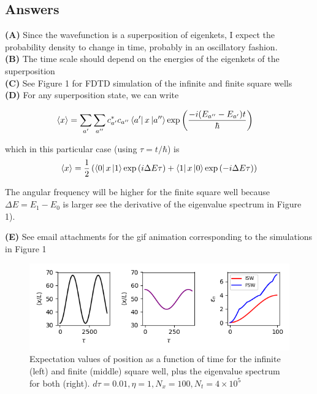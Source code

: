 \documentclass[12pt]{article}
\theoremstyle{definition}
\begin{document}
{\subsection{Answers}

\noindent \textbf{(A)} Since the wavefunction is a superposition of eigenkets, I expect the probability density to change in time, probably in an oscillatory fashion.\\
\noindent \textbf{(B)} The time scale should depend on the energies of the eigenkets of the superposition\\
\noindent \textbf{(C)} See Figure 1 for FDTD simulation of the infinite and finite square wells\\
\noindent \textbf{(D)} For any superposition state, we can write

\begin{align*}
\langle x \rangle &= \sum_{a'}\sum_{a''}c_{a'}^{*}c_{a''}\bra{a'}x\ket{a''}\exp\left(\frac{-i(E_{a''}-E_{a'})t}{\hbar}\right)
\end{align*}

which in this particular case (using $\tau = t/\hbar$) is
\begin{align*}
\langle x \rangle = \frac{1}{2}\left(\bra{0}x\ket{1}\exp\left(i\Delta E\tau\right) + \bra{1}x\ket{0}\exp\left(-i\Delta E\tau\right)\right)\\
\end{align*}


The angular frequency will be higher for the finite square well because $\Delta E = E_{1}-E_{0}$ is larger see the derivative of the eigenvalue spectrum in Figure 1).


\noindent \textbf{(E)} See email attachments for the gif animation corresponding to the simulations in Figure 1


\begin{figure}
\includegraphics[scale=1]{Figure_1.png}
\centering
\caption{Expectation values of position as a function of time for the infinite (left) and finite (middle) square well, plus the eigenvalue spectrum for both (right). $d\tau = 0.01, \eta =1, N_{x}=100, N_{t} = 4\times 10^{5}$}
\end{figure}


}
\end{document}
